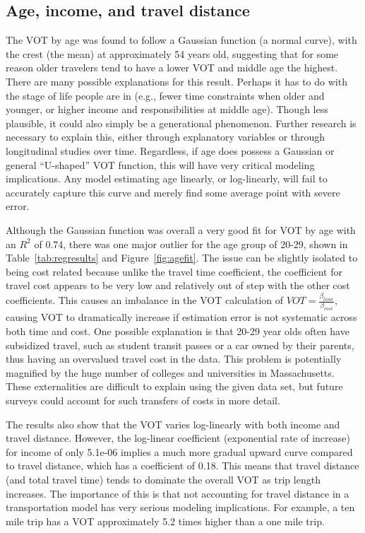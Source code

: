 \documentclass[numbered]{trbunofficial}\usepackage[]{graphicx}\usepackage[]{color}
\begin{document}
\subsection{Age, income, and travel distance}
The VOT by age was found to follow a Gaussian function (a normal curve), with the crest (the mean) at approximately 54 years old, suggesting that for some reason older travelers tend to have a lower VOT and middle age the highest. There are many possible explanations for this result. Perhaps it has to do with the stage of life people are in (e.g., fewer time constraints when older and younger, or higher income and responsibilities at middle age). Though less plausible, it could also simply be a generational phenomenon. Further research is necessary to explain this, either through explanatory variables or through longitudinal studies over time. Regardless, if age does possess a Gaussian or general ``U-shaped'' VOT function, this will have very critical modeling implications. Any model estimating age linearly, or log-linearly, will fail to accurately capture this curve and merely find some average point with severe error.

Although the Gaussian function was overall a very good fit for VOT by age with an $R^2$ of  0.74, there was one major outlier for the age group of 20-29, shown in Table~\ref{tab:regresults} and Figure~\ref{fig:agefit}. The issue can be slightly isolated to being cost related because unlike the travel time coefficient, the coefficient for travel cost appears to be very low and relatively out of step with the other cost coefficients. This causes an imbalance in the VOT calculation of $VOT = \frac{\beta_{time}}{\beta_{cost}}$, causing VOT to dramatically increase if estimation error is not systematic across both time and cost. One possible explanation is that 20-29 year olds often have subsidized travel, such as student transit passes or a car owned by their parents, thus having an overvalued travel cost in the data. This problem is potentially magnified by the huge number of colleges and universities in Massachusetts. These externalities are difficult to explain using the given data set, but future surveys could account for such transfers of costs in more detail. 

The results also show that the VOT varies log-linearly with both income and travel distance. However, the log-linear coefficient (exponential rate of increase) for income of only 5.1e-06 implies a much more gradual upward curve compared to travel distance, which has a coefficient of 0.18. This means that travel distance (and total travel time) tends to dominate the overall VOT as trip length increases. The importance of this is that not accounting for travel distance in a transportation model has very serious modeling implications. For example, a ten mile trip has a VOT approximately 5.2 times higher than a one mile trip.
\end{document}
